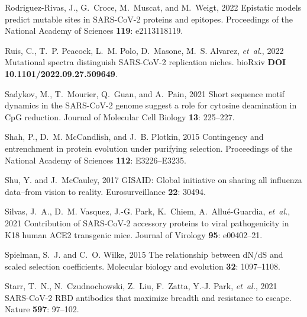 \documentclass[9pt,twocolumn,twoside]{gsajnl_modified}
\begin{document}
{\begin{thebibliography}{76}
{Rodriguez-Rivas, J., G.~Croce, M.~Muscat, {\rm and} M.~Weigt}, 2022 Epistatic
  models predict mutable sites in {SARS-CoV-2} proteins and epitopes.
  Proceedings of the National Academy of Sciences {\bf 119}: e2113118119.

{Ruis, C., T.~P. Peacock, L.~M. Polo, D.~Masone, M.~S. Alvarez, {\em
  et~al.\/}}, 2022 Mutational spectra distinguish {SARS-CoV-2} replication
  niches. bioRxiv {\bf DOI 10.1101/2022.09.27.509649}.

{Sadykov, M., T.~Mourier, Q.~Guan, {\rm and} A.~Pain}, 2021 {Short sequence
  motif dynamics in the SARS-CoV-2 genome suggest a role for cytosine
  deamination in CpG reduction}. Journal of Molecular Cell Biology {\bf 13}:
  225--227.

{Shah, P., D.~M. McCandlish, {\rm and} J.~B. Plotkin}, 2015 Contingency and
  entrenchment in protein evolution under purifying selection. Proceedings of
  the National Academy of Sciences {\bf 112}: E3226--E3235.

{Shu, Y. {\rm and} J.~McCauley}, 2017 {GISAID}: Global initiative on sharing
  all influenza data--from vision to reality. Eurosurveillance {\bf 22}: 30494.

{Silvas, J.~A., D.~M. Vasquez, J.-G. Park, K.~Chiem, A.~Allu{\'e}-Guardia, {\em
  et~al.\/}}, 2021 {Contribution of SARS-CoV-2 accessory proteins to viral
  pathogenicity in K18 human ACE2 transgenic mice}. Journal of Virology {\bf
  95}: e00402--21.

{Spielman, S.~J. {\rm and} C.~O. Wilke}, 2015 The relationship between {dN/dS}
  and scaled selection coefficients. Molecular biology and evolution {\bf 32}:
  1097--1108.

{Starr, T.~N., N.~Czudnochowski, Z.~Liu, F.~Zatta, Y.-J. Park, {\em et~al.\/}},
  2021 {SARS-CoV-2 RBD} antibodies that maximize breadth and resistance to
  escape. Nature {\bf 597}: 97--102.


\end{thebibliography}}
\end{document}
